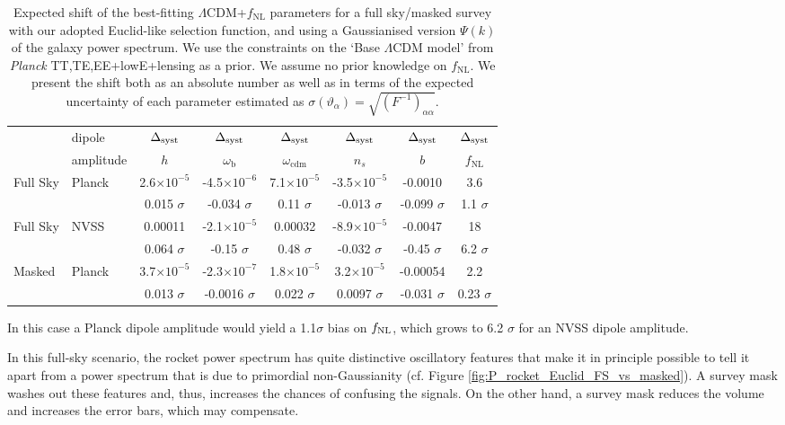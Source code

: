 \documentclass[a4paper,11pt]{article}
\begin{document}
\begin{table}[ht]
    \centering
    \begin{tabular}{|l|l|c|c|c|c|c|c|}
        \hline & dipole& $\Delta_{\rm syst}$& $\Delta_{\rm syst}$&  $\Delta_{\rm syst}$&  $\Delta_{\rm syst}$&  $\Delta_{\rm syst}$&  $\Delta_{\rm syst}$\\
        & amplitude & $h$ & $\omega_\mathrm{b}$ & $\omega_\mathrm{cdm}$ & $n_s$ & $b$ & $f_\mathrm{NL}$ \\\hline\hline
        Full Sky & Planck  &  2.6$\times 10^{-5}$
 &  -4.5$\times 10^{-6}$
 &  7.1$\times 10^{-5}$
 &  -3.5$\times 10^{-5}$
 &  -0.0010
 &  3.6\\
 & &  0.015 $\sigma$
 &  -0.034 $\sigma$
 &  0.11 $\sigma$
 &  -0.013 $\sigma$
 &  -0.099 $\sigma$
 &  1.1 $\sigma$
\\\hline
Full Sky & NVSS  &  0.00011
 &  -2.1$\times 10^{-5}$
 &  0.00032
 &  -8.9$\times 10^{-5}$
 &  -0.0047
 &  18\\
 & &  0.064 $\sigma$
 &  -0.15 $\sigma$
 &  0.48 $\sigma$
 &  -0.032 $\sigma$
 &  -0.45 $\sigma$
 &  6.2 $\sigma$\\\hline
Masked &        Planck  &  3.7$\times 10^{-5}$
 &  -2.3$\times 10^{-7}$
 &  1.8$\times 10^{-5}$
 &  3.2$\times 10^{-5}$
 &  -0.00054
 &  2.2

\\
& &  0.013 $\sigma$
 &  -0.0016 $\sigma$
 &  0.022 $\sigma$
 &  0.0097 $\sigma$
 &  -0.031 $\sigma$
 &  0.23 $\sigma$
\\\hline
    \end{tabular}
    \caption{Expected shift of the best-fitting $\Lambda$CDM+$f_\mathrm{NL}$ parameters for a full sky/masked survey with our adopted Euclid-like selection function,  and using a Gaussianised version $\Psi(k)$ of the galaxy power spectrum. We use the constraints on the `Base $\Lambda$CDM model' from \textit{Planck} TT,TE,EE+lowE+lensing \cite{Aghanim:2018eyx} as a prior. We assume no prior knowledge on $f_\mathrm{NL}$. We present the shift both as an absolute number as well as in terms of the expected uncertainty of each parameter estimated as $\sigma(\vartheta_\alpha)=\sqrt{(F^{-1})_{\alpha\alpha}}$.}
    \label{tab:FS_shifts_main}
\end{table}
In this case a  Planck dipole amplitude would yield a 1.1$\sigma$ bias on $f_{\rm NL}$, which grows to 6.2 $\sigma$ for an NVSS dipole amplitude. 

In this full-sky scenario, the rocket power spectrum has quite distinctive oscillatory features that make it in principle possible to tell it apart from a power spectrum that is due to primordial non-Gaussianity (cf. Figure \ref{fig:P_rocket_Euclid_FS_vs_masked}). A survey mask washes out these features and, thus, increases the chances of confusing the signals. On the other hand, a survey mask reduces the volume and increases the error bars, which may compensate. 
\end{document}
